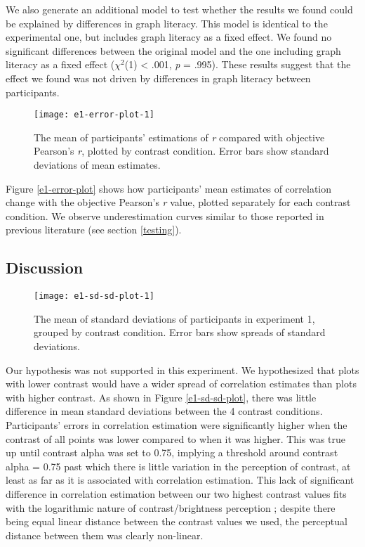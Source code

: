 \documentclass[preprint, 3p,
authoryear]{elsarticle} %
\begin{document}
We also generate an additional model to test whether the results we
found could be explained by differences in graph literacy. This model is
identical to the experimental one, but includes graph literacy as a
fixed effect. We found no significant differences between the original
model and the one including graph literacy as a fixed effect
(\(\chi^2\)(1) \textless{} .001, \emph{p} = .995). These results suggest
that the effect we found was not driven by differences in graph literacy
between participants.

\begin{figure}

{\centering \texttt{[image: e1-error-plot-1]} 

}

\caption{\label{e1-error-plot}The mean of participants' estimations of \textit{r} compared with objective Pearson's \textit{r}, plotted by contrast condition. Error bars show standard deviations of mean estimates.}\label{fig:e1-error-plot}
\end{figure}

Figure \ref{e1-error-plot} shows how participants' mean estimates of
correlation change with the objective Pearson's \emph{r} value, plotted
separately for each contrast condition. We observe underestimation
curves similar to those reported in previous literature (see section
\ref{testing}).

\hypertarget{discussion}{%
\subsection{Discussion}\label{discussion}}

\begin{figure}

\texttt{[image: e1-sd-sd-plot-1]} \hfill{}

\caption{\label{e1-sd-sd-plot}The mean of standard deviations of participants in experiment 1, grouped by contrast condition. Error bars show spreads of standard deviations.}\label{fig:e1-sd-sd-plot}
\end{figure}

Our hypothesis was not supported in this experiment. We hypothesized
that plots with lower contrast would have a wider spread of correlation
estimates than plots with higher contrast. As shown in Figure
\ref{e1-sd-sd-plot}, there was little difference in mean standard
deviations between the 4 contrast conditions. Participants' errors in
correlation estimation were significantly higher when the contrast of
all points was lower compared to when it was higher. This was true up
until contrast alpha was set to 0.75, implying a threshold around
contrast alpha = 0.75 past which there is little variation in the
perception of contrast, at least as far as it is associated with
correlation estimation. This lack of significant difference in
correlation estimation between our two highest contrast values fits with
the logarithmic nature of contrast/brightness perception
\citep{varshney_2013, fechner_1948}; despite there being equal linear
distance between the contrast values we used, the perceptual distance
between them was clearly non-linear.
\end{document}
